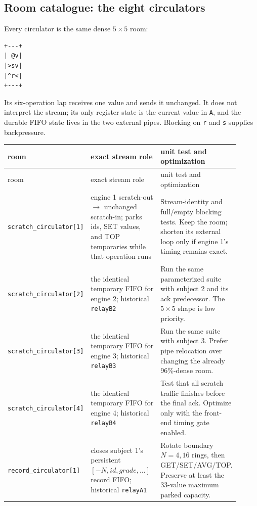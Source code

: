 \documentclass[11pt,a4paper]{article}
\newcommand{\op}[1]{\texttt{#1}}
\begin{document}
\subsection{Room catalogue: the eight circulators}

Every circulator is the same dense $5\times5$ room:

\begin{verbatim}
+---+
| @v|
|>sv|
|^r<|
+---+
\end{verbatim}

Its six-operation lap receives one value and sends it unchanged. It does not
interpret the stream; its only register state is the current value in
\op{A}, and the durable FIFO state lives in the two external pipes. Blocking
on \op{r} and \op{s} supplies backpressure.

\small
\begin{longtable}{
  >{\raggedright\arraybackslash}p{0.24\linewidth}
  >{\raggedright\arraybackslash}p{0.38\linewidth}
  >{\raggedright\arraybackslash}p{0.29\linewidth}}
room & exact stream role & unit test and optimization \\ \hline
\endfirsthead
room & exact stream role & unit test and optimization \\ \hline
\endhead
\texttt{scratch\_circulator[1]} &
engine 1 scratch-out $\to$ unchanged scratch-in; parks ids, SET values, and
TOP temporaries while that operation runs &
Stream-identity and full/empty blocking tests. Keep the room; shorten its
external loop only if engine 1's timing remains exact.\\
\texttt{scratch\_circulator[2]} &
the identical temporary FIFO for engine 2; historical \texttt{relayB2} &
Run the same parameterized suite with subject 2 and its ack predecessor.
The $5\times5$ shape is low priority.\\
\texttt{scratch\_circulator[3]} &
the identical temporary FIFO for engine 3; historical \texttt{relayB3} &
Run the same suite with subject 3. Prefer pipe relocation over changing the
already 96\%-dense room.\\
\texttt{scratch\_circulator[4]} &
the identical temporary FIFO for engine 4; historical \texttt{relayB4} &
Test that all scratch traffic finishes before the final ack. Optimize only
with the front-end timing gate enabled.\\
\texttt{record\_circulator[1]} &
closes subject 1's persistent $[-N,id,grade,\ldots]$ record FIFO; historical
\texttt{relayA1} &
Rotate boundary $N=4,16$ rings, then GET/SET/AVG/TOP. Preserve at least the
33-value maximum parked capacity.\\

\end{longtable}
\end{document}
